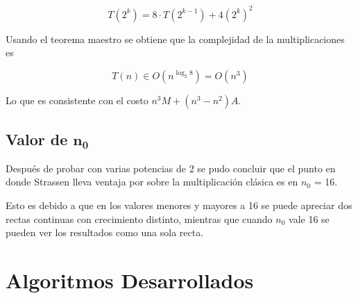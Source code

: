 \documentclass[12pt,letterpaper]{scrartcl}
\begin{document}
$$ T(2^k) = 8\cdot T( 2^{k-1}) + 4(2^k)^2 $$

Usando el teorema maestro se obtiene que la complejidad de la multiplicaciones es

$$T(n) \in O(n^{\log_2 8}) = O ( n^{3} )$$

Lo que es consistente con el costo $n^3M + (n^3 - n^2)A$.

\subsection{Valor de $\mathbf{n_0}$}

Después de probar con varias potencias de 2 se pudo concluir que el punto en donde Strassen lleva ventaja por sobre la multiplicación clásica es en $n_0$ = 16. 

Esto es debido a que en los valores menores y mayores a 16 se puede apreciar dos rectas continuas con crecimiento distinto, mientras que cuando $n_0$ vale 16 se pueden ver los resultados como una sola recta.


\section{Algoritmos Desarrollados}
\end{document}
